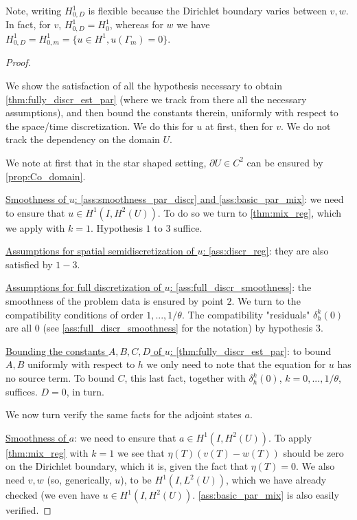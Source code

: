 \documentclass[english,a4paper,9pt,oneside]{scrbook}	%
\theoremstyle{break}
\newenvironment{mproof}[1][\proofname]{%
  \begin{proof}[#1]$ $\par\nobreak\ignorespaces
}{%
  \end{proof}
}
\renewcommand*{\proofname}{Proof}
\theoremstyle{remark}
\begin{document}
Note, writing $H^1_{0,D}$ is flexible because the Dirichlet boundary varies between $v,w$. In fact, for $v$, $H^1_{0,D}=H^1_0$, whereas for $w$ we have $H^1_{0,D}=H^1_{0,m}=\{u \in H^1, u(\Gamma_m)=0\}$.

\begin{mproof}

We show the satisfaction of all the hypothesis necessary to obtain \cref{thm:fully_discr_est_par} (where we track from there all the necessary assumptions), and then bound the constants therein, uniformly with respect to the space/time discretization. We do this for $u$ at first, then for $v$. We do not track the dependency on the domain $U$.

We note at first that in the star shaped setting, $\partial U \in C^2$ can be ensured by \cref{prop:Co_domain}.

\underline{Smoothness of $u$: \cref{ass:smoothness_par_discr} and  \cref{ass:basic_par_mix}}: we need to ensure that $u \in H^1(I,H^2(U))$. To do so we turn to \cref{thm:mix_reg}, which we apply with $k=1$. Hypothesis $1$ to $3$ suffice. 

\underline{Assumptions for spatial semidiscretization of $u$: \cref{ass:discr_reg}}: they are also satisfied by $1-3$.

\underline{Assumptions for full discretization of $u$: \cref{ass:full_discr_smoothness}}: the smoothness of the problem data is ensured by point $2$. We turn to the compatibility conditions of order $1,...,1/\theta$. The compatibility "residuals" $\delta_h^k(0)$ are all $0$ (see \cref{ass:full_discr_smoothness} for the notation) by hypothesis $3$.

\underline{Bounding the constants $A,B,C,D$ of $u$: \cref{thm:fully_discr_est_par}}: to bound $A,B$ uniformly with respect to $h$ we only need to note that the equation for $u$ has no source term. To bound $C$, this last fact, together with $\delta_h^k(0)$, $k=0,...,1/\theta$, suffices. $D=0$, in turn.

We now turn verify the same facts for the adjoint states $a$.

\underline{Smoothness of $a$}: we need to ensure that $a \in H^1(I,H^2(U))$. To apply \cref{thm:mix_reg} with $k=1$ we see that $\eta(T)(v(T)-w(T))$ should be zero on the Dirichlet boundary, which it is, given the fact that $\eta(T)=0$. We also need $v,w$ (so, generically, $u$), to be $H^1(I, L^2(U))$, which we have already checked (we even have $u \in H^1(I,H^2(U))$.  \cref{ass:basic_par_mix} is also easily verified.


\end{mproof}
\end{document}
